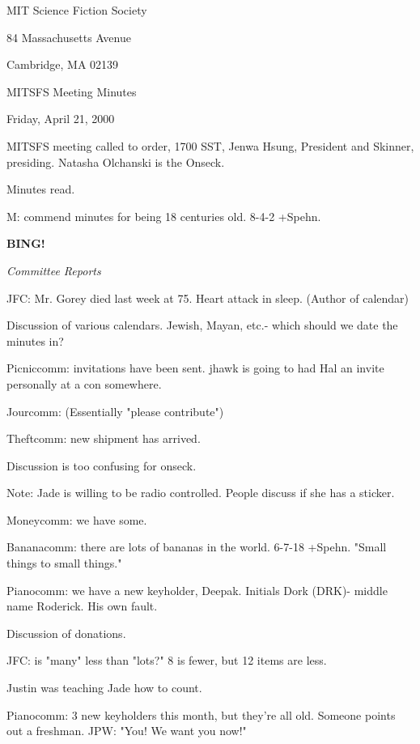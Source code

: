 \documentclass[12pt]{article}
\newcommand{\bing}{{\bf BING!} }
\newcommand{\goto}[1]{\bing \vskip 12pt \centerline{{\em{#1}}}}
\begin{document}
\begin{center}

MIT Science Fiction Society 

84 Massachusetts Avenue

Cambridge, MA 02139

\vspace{12pt}

MITSFS Meeting Minutes 

Friday, April 21, 2000

\end{center}
 
\vspace{18pt}

\setlength{\parskip}{6pt}

\noindent
MITSFS meeting called to order, 1700 SST, Jenwa Hsung, President and
Skinner, presiding.  Natasha Olchanski is the Onseck.

Minutes read.

M: commend minutes for being 18 centuries old. 8-4-2 +Spehn.

\goto{Committee Reports}

JFC: Mr. Gorey died last week at 75. Heart attack in sleep. (Author of calendar)

Discussion of various calendars. Jewish, Mayan, etc.- which should we date the minutes in?

Picniccomm: invitations have been sent. jhawk is going to had Hal an invite personally at a con somewhere.

Jourcomm: (Essentially "please contribute")

Theftcomm: new shipment has arrived.

Discussion is too confusing for onseck.

Note: Jade is willing to be radio controlled. People discuss if she has a sticker.

Moneycomm: we have some.

Bananacomm: there are lots of bananas in the world. 6-7-18 +Spehn. "Small things to small things."

Pianocomm: we have a new keyholder, Deepak. Initials Dork (DRK)- middle name Roderick. His own fault.

Discussion of donations.

JFC: is "many" less than "lots?" 8 is fewer, but 12 items are less.

Justin was teaching Jade how to count.

Pianocomm: 3 new keyholders this month, but they're all old. Someone points out a freshman. JPW: "You! We want you now!"
\end{document}
